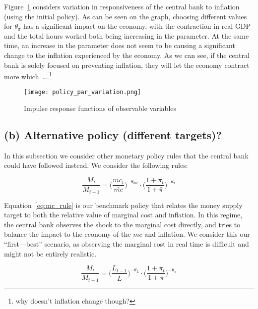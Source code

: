 \documentclass[12pt]{article}
\begin{document}
Figure~\ref{fig:policy_par_variation} considers variation in responsiveness of the central bank to inflation (using the initial policy). As can be seen on the graph, choosing different values for $\theta_{\pi}$ has a significant impact on the economy, with the contraction in real GDP and the total hours worked both being increasing in the parameter. At the same time, an increase in the parameter does not seem to be causing a significant change to the inflation experienced by the economy. As we can see, if the central bank is solely focused on preventing inflation, they will let the economy contract more which\ \dots.\footnote{why doesn't inflation change though?}

\begin{figure}[!h]
    \caption{Impulse response functions of observable variables}\label{fig:policy_par_variation}
    \centering
    \texttt{[image: policy\_par\_variation.png]}
\end{figure}


\subsection*{(b) Alternative policy (different targets)?}

In this subsection we consider other monetary policy rules that the central bank could have followed instead. We consider the following rules:

\begin{equation}\label{eq:mc_rule}
    \frac{M_t}{M_{t-1}}
          = \Big(\frac{mc_t}{\bar{mc}}\Big)^{-\theta_{mc}}
            \cdot \Big(\frac{1 + \pi_t}{1 + \bar{\pi}}\Big)^{-\theta_{\pi}}
\end{equation}

Equation~\ref{eq:mc_rule} is our benchmark policy that relates the money supply target to both the relative value of marginal cost and inflation. In this regime, the central bank observes the shock to the marginal cost directly, and tries to balance the impact to the economy of the $mc$ and inflation. We consider this our ``first---best'' scenario, as observing the marginal cost in real time is difficult and might not be entirely realistic.

\begin{equation}\label{eq:lab_rule}
    \frac{M_t}{M_{t-1}}
        = \Big(\frac{L_{t-1}}{\bar{L}}\Big)^{-\theta_L}
          \cdot \Big(\frac{1 + \pi_t}{1 + \bar{\pi}}\Big)^{-\theta_{\pi}}
\end{equation}
\end{document}
